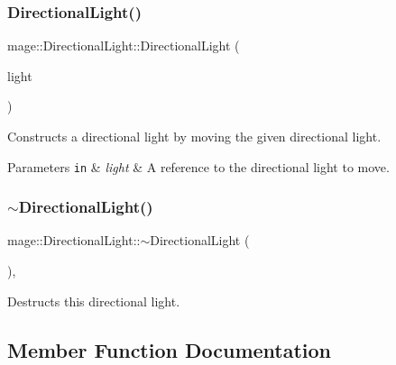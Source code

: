 \subsubsection{\texorpdfstring{Directional\+Light()}{DirectionalLight()}\hspace{0.1cm}{\footnotesize\ttfamily [3/3]}}
{\footnotesize\ttfamily mage\+::\+Directional\+Light\+::\+Directional\+Light (\begin{DoxyParamCaption}\item[{\hyperlink{classmage_1_1_directional_light}{Directional\+Light} \&\&}]{light }\end{DoxyParamCaption})\hspace{0.3cm}{\ttfamily [default]}}

Constructs a directional light by moving the given directional light.


\begin{DoxyParams}[1]{Parameters}
\mbox{\tt in}  & {\em light} & A reference to the directional light to move. \\
\hline
\end{DoxyParams}
\hypertarget{classmage_1_1_directional_light_a967d33c11a1477c01ce4c9720337caeb}{}\label{classmage_1_1_directional_light_a967d33c11a1477c01ce4c9720337caeb} 
\subsubsection{\texorpdfstring{$\sim$\+Directional\+Light()}{~DirectionalLight()}}
{\footnotesize\ttfamily mage\+::\+Directional\+Light\+::$\sim$\+Directional\+Light (\begin{DoxyParamCaption}{ }\end{DoxyParamCaption})\hspace{0.3cm}{\ttfamily [virtual]}, {\ttfamily [default]}}

Destructs this directional light. 

\subsection{Member Function Documentation}
\hypertarget{classmage_1_1_directional_light_a779c49e066215cff9f80ed40048dfc62}{}\label{classmage_1_1_directional_light_a779c49e066215cff9f80ed40048dfc62} 

